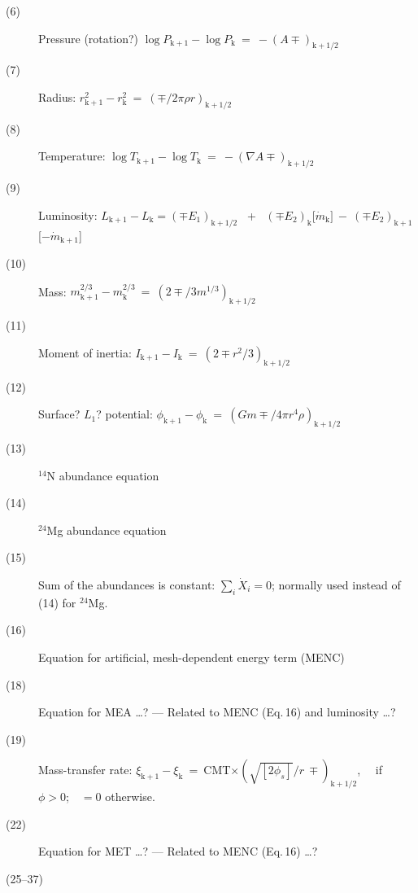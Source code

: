\begin{description}
\item[(6)]   Pressure (rotation?) $\log P_{\mathrm{k} +1}  - \log P_\mathrm{k } \  = \  - (A\mp )_{\mathrm{k} +1/2}$
\item[(7)]   Radius: $r^2_{\mathrm{k} +1} - r^2_\mathrm{k } \  = \  (\mp /2\pi \rho r)_{\mathrm{k} +1/2}$
\item[(8)]   Temperature: $\log T_{\mathrm{k} +1} - \log T_\mathrm{k } \  = \  - (\nabla A \mp)_{\mathrm{k} +1/2}$
\item[(9)]   Luminosity: $L_{\mathrm{k} +1} - L_\mathrm{k } = (\mp E_1)_{\mathrm{k} +1/2}$     \ + \   $(\mp E_2)_\mathrm{k}$[$\dot{m}_\mathrm{k}] 
             \ - \ (\mp E_2)_\mathrm{k + 1}$ [$-\dot{m}_{\mathrm{k} +1}$] 
\item[(10)]  Mass: $m_{\mathrm{k} +1}^{2/3} - m_\mathrm{k }^{2/3} \  = \   (2\mp/3m^{1/3})_{\mathrm{k} +1/2}$ 
\item[(11)]  Moment of inertia: $I_{\mathrm{k} +1} - I_\mathrm{k } \  = \  (2\mp r^2 /3)_{\mathrm{k} +1/2}$
\item[(12)]  Surface? $L_1$? potential: $\phi_{\mathrm{k} +1} - \phi_\mathrm{k } \  = \   (Gm\mp /4\pi r^4\rho)_{\mathrm{k} +1/2}$
\item[(13)]  $^{14}$N abundance equation
\item[(14)]  $^{24}$Mg abundance equation
\item[(15)]  Sum of the abundances is constant: $\sum_i \dot{X}_i = 0$; normally used instead of (14) for $^{24}$Mg.
\item[(16)]  Equation for artificial, mesh-dependent energy term (MENC)
\item[(18)]  Equation for MEA \ldots?  --- Related to MENC (Eq.\,16) and luminosity \ldots?
\item[(19)]  Mass-transfer rate: $\xi_{\mathrm{k}+1} - \xi_\mathrm{k} \  = \ $CMT$ \times (\sqrt{[2\phi_s]}/r\ \mp)_{\mathrm{k} +1/2}$, \ \ if\ \  $\phi > 0$;\ \  $=0$ otherwise.

\item[(22)]  Equation for MET \ldots?  --- Related to MENC (Eq.\,16) \ldots?

\item[(25--37)]  



\end{description}
